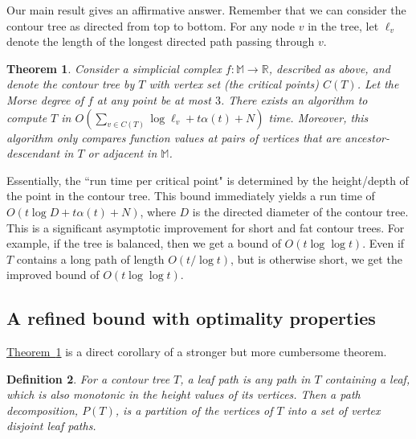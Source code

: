 \documentclass[11pt]{article}
\newtheorem{theorem}{Theorem}[section]
\newtheorem{definition}[theorem]{Definition}
\theoremstyle{definition}
\newcommand{\MM}{\mathbb{M}}
\newcommand{\RR}{\mathbb{R}}
\newcommand{\Thm}[1]{\hyperref[thm:#1]{Theorem~\ref*{thm:#1}}} %
\begin{document}
Our main result gives an affirmative answer. Remember that we can consider
the contour tree as directed from top to bottom. For any node $v$ in the tree, let $\ell_v$ denote the length of the 
longest directed path passing through $v$. 

\begin{theorem} \label{thm:main-corr} Consider a simplicial complex $f:\MM \to \RR$, described as above, and denote
the contour tree by $T$ with vertex set (the critical points) $C(T)$. 
Let the Morse degree of $f$ at any point be at most $3$.
There exists an algorithm to compute $T$
in $O(\sum_{v \in C(T)} \log \ell_v + t\alpha(t) + N)$ time. Moreover, this algorithm only
compares function values at pairs of vertices that are ancestor-descendant in $T$ or adjacent in $\MM$.
\end{theorem}

Essentially, the ``run time per critical point" is determined by the height/depth of the point in the contour tree.
This bound immediately yields a run time of $O(t\log D + t\alpha(t) + N)$,
where $D$ is the directed diameter of the contour tree. 
This is a significant asymptotic improvement for short and fat contour trees. For example, if the tree is balanced,
then we get a bound of $O(t\log\log t)$.
Even if $T$ contains a long path of length $O(t/\log t)$, but is otherwise short, we get the improved bound of $O(t\log\log t)$.

\subsection{A refined bound with optimality properties}\label{sec:more-refined}

\Thm{main-corr} is a direct corollary of a stronger but more cumbersome theorem.



\begin{definition}
\label{def:path} 
For a contour tree $T$, a \emph{leaf path} is any path in $T$ containing a leaf, 
which is also monotonic in the height values of its vertices. 
Then a \emph{path decomposition}, $P(T)$, is a partition of the vertices of $T$ into a set of vertex disjoint leaf paths.  
\end{definition}
\end{document}
